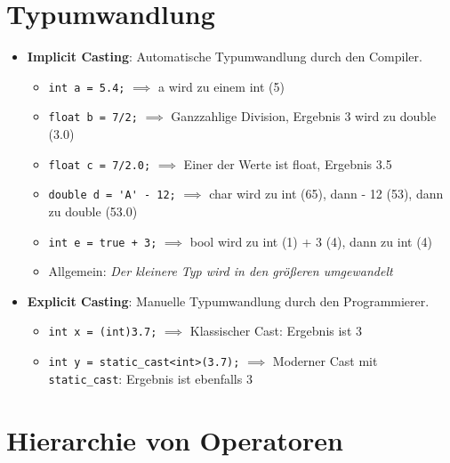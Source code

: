 \documentclass[10pt, a3paper, landscape]{article}
\newcommand{\datastruct}[1]{\textbf{\textcolor{red!60!black}{#1}}}
\begin{document}
\begin{multicols*}{4}

\section{Typumwandlung}

\begin{itemize}
    \item \datastruct{Implicit Casting}: Automatische Typumwandlung durch den Compiler.
    \begin{itemize}
        \item \lstinline|int a = 5.4;| $\implies$ a wird zu einem int (5)
        \item \lstinline|float b = 7/2;| $\implies$ Ganzzahlige Division, Ergebnis 3 wird zu double (3.0)
        \item \lstinline|float c = 7/2.0;| $\implies$ Einer der Werte ist float, Ergebnis 3.5
        \item \lstinline|double d = 'A' - 12;| $\implies$ char wird zu int (65), dann - 12 (53), dann zu double (53.0)
        \item \lstinline|int e = true + 3;| $\implies$ bool wird zu int (1) + 3 (4), dann zu int (4)
        \item Allgemein: \textit{Der kleinere Typ wird in den größeren umgewandelt}
    \end{itemize}

    \item \datastruct{Explicit Casting}: Manuelle Typumwandlung durch den Programmierer.
    \begin{itemize} 
        \item \lstinline|int x = (int)3.7;| $\implies$ Klassischer Cast: Ergebnis ist 3
        \item \lstinline|int y = static_cast<int>(3.7);| $\implies$ Moderner Cast mit \lstinline|static_cast|: Ergebnis ist ebenfalls 3
    \end{itemize}
\end{itemize}

\section{Hierarchie von Operatoren}


\end{multicols*}
\end{document}
